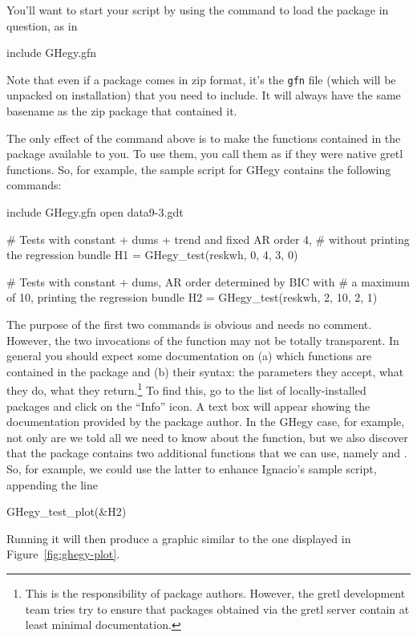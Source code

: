 \documentclass[oneside]{book}
\begin{document}
You'll want to start your script by using the  command
to load the package in question, as in
%
\begin{code}
include GHegy.gfn
\end{code}

Note that even if a package comes in zip format, it's the \texttt{gfn}
file (which will be unpacked on installation) that you need to
include. It will always have the same basename as the zip package that
contained it.

The only effect of the  command above is to make the
functions contained in the package available to you. To use them, you
call them as if they were native gretl functions. So, for example, the
sample script for \textsf{GHegy} contains the following commands:

\begin{code}
include GHegy.gfn
open data9-3.gdt

# Tests with constant + dums + trend and fixed AR order 4,
# without printing the regression
bundle H1 = GHegy_test(reskwh, 0, 4, 3, 0)

# Tests with constant + dums, AR order determined by BIC with
# a maximum of 10, printing the regression
bundle H2 = GHegy_test(reskwh, 2, 10, 2, 1)
\end{code}

The purpose of the first two commands is obvious and needs no
comment. However, the two invocations of the 
function may not be totally transparent. In general you should expect
some documentation on (a) which functions are contained in the package
and (b) their syntax: the parameters they accept, what they do, what
they return.\footnote{This is the responsibility of package authors.
  However, the gretl development team tries try to ensure that
  packages obtained via the gretl server contain at least minimal
  documentation.}  To find this, go to the list of locally-installed
packages and click on the ``Info'' icon. A text box will appear
showing the documentation provided by the package author. In the
\textsf{GHegy} case, for example, not only are we told all we need to
know about the  function, but we also discover that
the package contains two additional functions that we can use, namely
 and .  So, for
example, we could use the latter to enhance Ignacio's sample script,
appending the line
%
\begin{code}
GHegy_test_plot(&H2)
\end{code}
%
Running it will then produce a graphic similar to the one displayed in
Figure~\ref{fig:ghegy-plot}.
\end{document}
